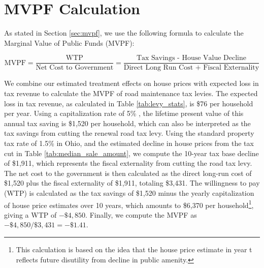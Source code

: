 
% 



\section{MVPF Calculation} \label{sec:appxmvpf}

As stated in Section \ref{sec:mvpf}, we use the following formula to calculate the Marginal Value of Public Funds (MVPF):

\begin{equation}
    \text{MVPF} = \frac{\text{WTP}}{\text{Net Cost to Government}} = \frac{\text{Tax Savings - House Value Decline}}{\text{Direct Long Run Cost + Fiscal Externality}}
\end{equation}

We combine our estimated treatment effects on house prices with expected loss in tax revenue to calculate the MVPF of road maintenance tax levies. The expected loss in tax revenue, as calculated in Table \ref{tab:levy_stats}, is \$76 per household per year. Using a capitalization rate of 5\% \citep{hilber2011economic, cellini2010value}, the lifetime present value of this annual tax saving is \$1,520 per household, which can also be interpreted as the tax savings from cutting the renewal road tax levy. Using the standard property tax rate of 1.5\% in Ohio, and the estimated decline in house prices from the tax cut in Table \ref{tab:median_sale_amount}, we compute the 10-year tax base decline of \$1,911, which represents the fiscal externality from cutting the road tax levy. The net cost to the government is then calculated as the direct long-run cost of \$1,520 plus the fiscal externality of \$1,911, totaling \$3,431. The willingness to pay (WTP) is calculated as the tax savings of \$1,520 minus the yearly capitalization of house price estimates over 10 years, which amounts to \$6,370 per household\footnote{This calculation is based on the idea that the house price estimate in year t reflects future disutility from decline in public amenity.}, giving a WTP of \(-\$4,850\). Finally, we compute the MVPF as \(-\$4,850 / \$3,431 = -\$1.41\). 

